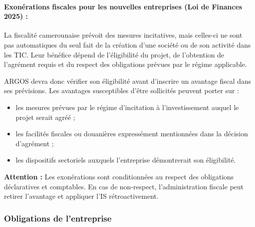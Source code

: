 \paragraph{Exonérations fiscales pour les nouvelles entreprises (Loi de Finances 2025) :}
La fiscalité camerounaise prévoit des mesures incitatives, mais celles-ci ne sont pas automatiques du seul fait de la création d'une société ou de son activité dans les TIC. Leur bénéfice dépend de l'éligibilité du projet, de l'obtention de l'agrément requis et du respect des obligations prévues par le régime applicable\cite{incitations2025}.

ARGOS devra donc vérifier son éligibilité avant d'inscrire un avantage fiscal dans ses prévisions. Les avantages susceptibles d'être sollicités peuvent porter sur :
\begin{itemize}
    \item les mesures prévues par le régime d'incitation à l'investissement auquel le projet serait agréé ;
    \item les facilités fiscales ou douanières expressément mentionnées dans la décision d'agrément ;
    \item les dispositifs sectoriels auxquels l'entreprise démontrerait son éligibilité.
\end{itemize}
\textbf{Attention :} Les exonérations sont conditionnées au respect des obligations déclaratives et comptables. En cas de non-respect, l'administration fiscale peut retirer l'avantage et appliquer l'IS rétroactivement.

\subsubsection{Obligations de l'entreprise}

